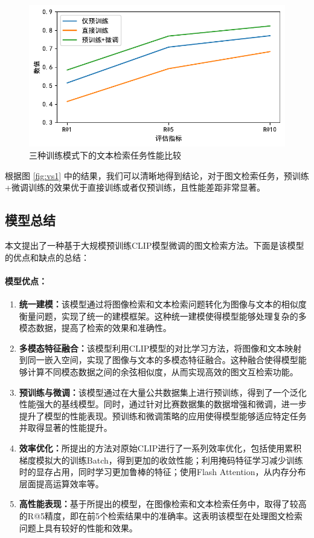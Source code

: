 \documentclass[a4paper]{zreport}
\begin{document}
\begin{figure}[h!]
\centering
\includegraphics[width=0.85\linewidth]{figures/vs1}
\caption{三种训练模式下的文本检索任务性能比较}
\label{fig:vs2}
\end{figure}

根据图 \ref{fig:vs1} 中的结果，我们可以清晰地得到结论，对于图文检索任务，预训练+微调训练的效果优于直接训练或者仅预训练，且性能差距非常显著。


\subsection{模型总结}

本文提出了一种基于大规模预训练CLIP模型微调的图文检索方法。下面是该模型的优点和缺点的总结：

\paragraph{模型优点：}

\begin{enumerate}
\item \textbf{统一建模：}该模型通过将图像检索和文本检索问题转化为图像与文本的相似度衡量问题，实现了统一的建模框架。这种统一建模使得模型能够处理复杂的多模态数据，提高了检索的效果和准确性。

\item \textbf{多模态特征融合：}该模型利用CLIP模型的对比学习方法，将图像和文本映射到同一嵌入空间，实现了图像与文本的多模态特征融合。这种融合使得模型能够计算不同模态数据之间的余弦相似度，从而实现高效的图文互检索功能。

\item \textbf{预训练与微调：}该模型通过在大量公共数据集上进行预训练，得到了一个泛化性能强大的基线模型。同时，通过针对比赛数据集的数据增强和微调，进一步提升了模型的性能表现。预训练和微调策略的应用使得模型能够适应特定任务并取得显著的性能提升。

\item \textbf{效率优化：}所提出的方法对原始CLIP进行了一系列效率优化，包括使用累积梯度模拟大的训练Batch，得到更加的收敛性能；利用掩码特征学习减少训练时的显存占用，同时学习更加鲁棒的特征；使用Flash Attention，从内存分布层面提高运算效率等。

\item \textbf{高性能表现：}基于所提出的模型，在图像检索和文本检索任务中，取得了较高的R@5精度，即在前5个检索结果中的准确率。这表明该模型在处理图文检索问题上具有较好的性能和效果。
\end{enumerate}
\end{document}
